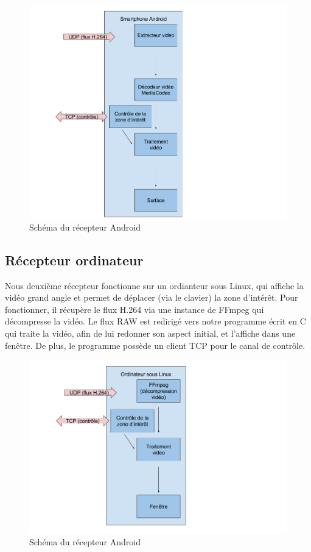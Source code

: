 \documentclass[11pt,a4paper]{article}
\begin{document}
\bigbreak
\begin{figure}[H]
\begin{center}
\includegraphics[scale=0.35]{images/schema_recepteur_android.png}
\end{center}
\caption{Schéma du récepteur Android}
\label{}
\end{figure}
\bigbreak

\subsection{Récepteur ordinateur}
Nous deuxième récepteur fonctionne sur un ordianteur sous Linux, qui affiche la vidéo grand angle et permet de déplacer (via le clavier) la zone d'intérêt.
Pour fonctionner, il récupère le flux H.264 via une instance de FFmpeg qui décompresse la vidéo.
Le flux RAW est redirigé vers notre programme écrit en C qui traite la vidéo, afin de lui redonner son aspect initial, et l'affiche dans une fenêtre.
De plus, le programme possède un client TCP pour le canal de contrôle.

\bigbreak
\begin{figure}[H]
\begin{center}
\includegraphics[scale=0.35]{images/schema_recepteur_linux.png}
\end{center}
\caption{Schéma du récepteur Android}
\label{}
\end{figure}
\bigbreak
\end{document}
